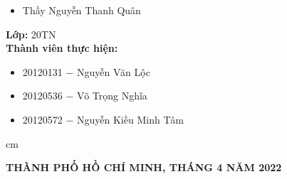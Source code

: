\begin{titlepage}
\begin{mybox}
\begin{itemize}
\item Thầy Nguyễn Thanh Quân
\end{itemize}
\textbf{Lớp:} 20TN\\
\textbf{Thành viên thực hiện:}
\begin{itemize}
\item 20120131 $-$ Nguyễn Văn Lộc
\item 20120536 $-$ Võ Trọng Nghĩa
\item 20120572 $-$ Nguyễn Kiều Minh Tâm
\end{itemize}
 cm
\begin{center}
\textbf{THÀNH PHỐ HỒ CHÍ MINH, THÁNG 4 NĂM 2022}
\end{center}
\end{mybox}
\end{titlepage}